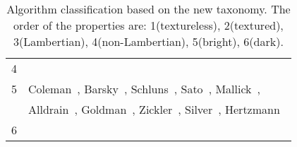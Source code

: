 \begin{sidewaystable}[h]
\begin{tabular}{c||l}
  4 & \\
  5 & Coleman~\cite{coleman1982obtaining}, Barsky~\cite{barsky20034}, Schluns~\cite{schluns1993photometric}, Sato~\cite{sato1994temporal}, Mallick~\cite{mallick2005beyond}, \\
    & Alldrain~\cite{alldrin2008photometric}, Goldman~\cite{goldman2010shape}, Zickler~\cite{zickler2002helmholtz}, Silver~\cite{silver1980determining}, Hertzmann~\cite{hertzmann2005example}\\
  6 & \\
  \hline
  \end{tabular}
  \caption{Algorithm classification based on the new taxonomy. The order of the properties are: 1(textureless), 2(textured), 3(Lambertian), 4(non-Lambertian), 5(bright), 6(dark).}
  \label{tab:algo_taxo}
\end{sidewaystable}